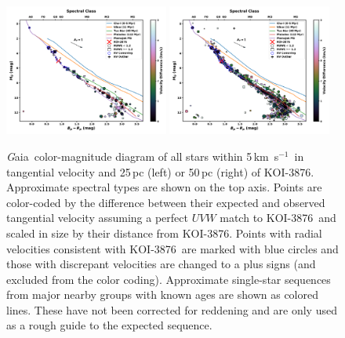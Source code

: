 \documentclass[twocolumn]{aastex631}
\newcommand{\starname}{KOI-3876}
\newcommand\kms{km~s$^{-1}$}
\newcommand{\gaia}{{\textit Gaia}}
\begin{document}
\begin{figure}[tb]
    \centering
    \includegraphics[width=0.48\textwidth]{KOI-3876_25cmd.pdf}
    \includegraphics[width=0.48\textwidth]{KOI-3876_50cmd.pdf}
    \caption{\gaia\ color-magnitude diagram of all stars within 5\,\kms\ in tangential velocity and 25\,pc (left) or 50\,pc (right) of \starname. Approximate spectral types are shown on the top axis. Points are color-coded by the difference between their expected and observed tangential velocity assuming a perfect $UVW$ match to \starname\ and scaled in size by their distance from \starname. Points with radial velocities consistent with \starname\ are marked with blue circles and those with discrepant velocities are changed to a plus signs (and excluded from the color coding). Approximate single-star sequences from major nearby groups with known ages are shown as colored lines. These have not been corrected for reddening and are only used as a rough guide to the expected sequence.  }
    \label{fig:CMD}
\end{figure} 
\end{document}
